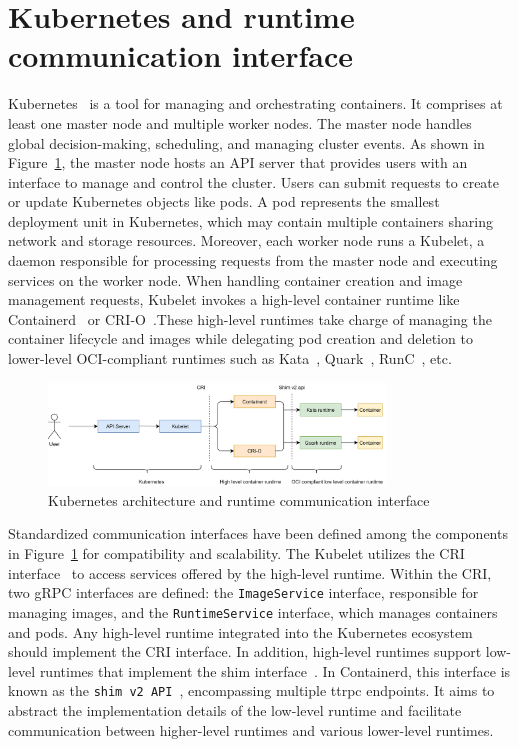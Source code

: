 \section{Kubernetes and runtime communication interface}
\label{sec:k8s}
Kubernetes~\cite*{k8s} is a tool for managing and orchestrating containers. It comprises at least one master node and multiple worker nodes. The master node handles global decision-making, scheduling, and managing cluster events. As shown in Figure~\ref{fig:k8s}, 
the master node hosts an API server that provides users with an interface to manage and control the cluster. Users can submit requests to create or update Kubernetes objects like pods. A pod represents the smallest deployment unit in Kubernetes, which may contain multiple containers sharing network 
and storage resources. Moreover, each worker node runs a Kubelet, a daemon responsible for processing requests from the master node and executing services on the worker node. When handling container creation and image management requests, Kubelet invokes a high-level container runtime like 
Containerd~\cite*{containerd} or CRI-O~\cite*{cri-o}.These high-level runtimes take charge of managing the container lifecycle and images while delegating pod creation and 
deletion to lower-level OCI-compliant runtimes such as Kata~\cite*{Kata-Containers}, Quark~\cite*{quark}, RunC~\cite*{runc}, etc.
\begin{figure}[htp]
  \centering
  \includegraphics[width=0.8\textwidth]{images/k8s.PNG}
  \caption[Kubernetes architecture and runtime communication interface]{Kubernetes architecture and runtime communication interface}
  \label{fig:k8s}
\end{figure}

Standardized communication interfaces have been defined among the components in Figure~\ref{fig:k8s} for compatibility and scalability. The Kubelet utilizes the CRI interface~\cite*{cri-interface} to access services offered by the high-level runtime. Within the CRI, two gRPC interfaces are defined: 
the \texttt{ImageService} interface, responsible for managing images, and the \texttt{RuntimeService} interface, which manages containers and pods. Any high-level runtime integrated into the Kubernetes ecosystem should implement the CRI interface. In addition, high-level runtimes support low-level 
runtimes that implement the shim interface~\cite*{shim_v2, cri0_shim_v2}. In Containerd, this interface is known as the \texttt{shim v2 API}~\cite*{shim_v2}, encompassing multiple ttrpc endpoints. It aims to abstract the implementation details of the low-level runtime and facilitate 
communication between higher-level runtimes and various lower-level runtimes.


